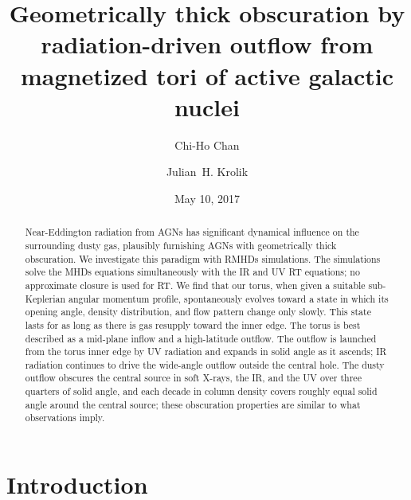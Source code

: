 \documentclass[twocolumn]{article}
\makeatletter
\let\ifaastex\@secondoftwo
\newcommand*\xray{\texorpdfstring{X\protect\nobreakdash-ray}{X-ray}}
\newcommand*\xrays{\xray s}
\makeatother
\begin{document}
\title{Geometrically thick obscuration by radiation-driven outflow from
magnetized tori of active galactic nuclei}
\author{Chi-Ho Chan}
\author{Julian~H. Krolik}
\date{May 10, 2017}


\begin{abstract}
\ifaastex\raggedright{}
Near-Eddington radiation from \acp{AGN} has significant dynamical influence on
the surrounding dusty gas, plausibly furnishing \acp{AGN} with geometrically
thick obscuration. We investigate this paradigm with \aclp{RMHD} simulations.
The simulations solve the \aclp{MHD} equations simultaneously with the \ac{IR}
and \ac{UV} \ac{RT} equations; no approximate closure is used for \ac{RT}. We
find that our torus, when given a suitable sub-Keplerian angular momentum
profile, spontaneously evolves toward a state in which its opening angle,
density distribution, and flow pattern change only slowly. This
 state lasts for as long as there is gas resupply toward the
inner edge. The torus is best described as a mid-plane inflow and a
high-latitude outflow. The outflow is launched from the torus inner edge by
\ac{UV} radiation and expands in solid angle as it ascends; \ac{IR} radiation
continues to drive the wide-angle outflow outside the central hole. The dusty
outflow obscures the central source in soft \xrays, the \ac{IR}, and the
\ac{UV} over three quarters of solid angle, and each decade in column density
covers roughly equal solid angle around the central source; these obscuration
properties are similar to what observations imply.
\end{abstract}
\acresetall\acuseshort

\section{Introduction}
\end{document}
